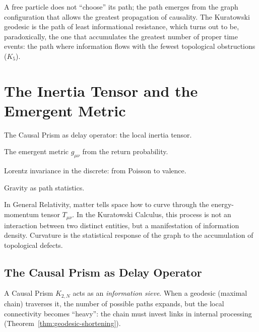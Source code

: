\noindent
A free particle does not ``choose'' its path; the path emerges from
the graph configuration that allows the greatest propagation of
causality. The Kuratowski geodesic is the path of least informational
resistance, which turns out to be, paradoxically, the one that
accumulates the greatest number of proper time events: the path where
information flows with the fewest topological obstructions ($K_5$).

\chapter{The Inertia Tensor and the Emergent Metric}

\begin{introduction}
  \item The Causal Prism as delay operator: the local inertia tensor.
  \item The emergent metric $g_{\mu\nu}$ from the return probability.
  \item Lorentz invariance in the discrete: from Poisson to valence.
  \item Gravity as path statistics.
\end{introduction}

In General Relativity, matter tells space how to curve through the
energy-momentum tensor $T_{\mu\nu}$. In the Kuratowski Calculus, this
process is not an interaction between two distinct entities, but a
manifestation of information density. Curvature is the statistical
response of the graph to the accumulation of topological defects.

\section{The Causal Prism as Delay Operator}

A Causal Prism $K_{2,N}$ acts as an \emph{information sieve}. When a
geodesic (maximal chain) traverses it, the number of possible paths
expands, but the local connectivity becomes ``heavy'': the chain must
invest links in internal processing
(Theorem~\ref{thm:geodesic-shortening}).

